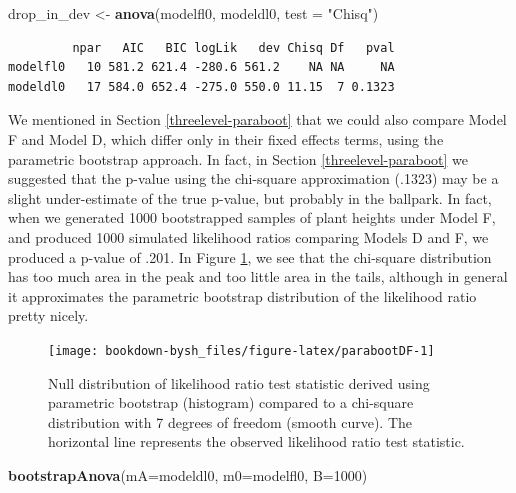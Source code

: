 \documentclass[
]{krantz}
\newenvironment{Shaded}{\begin{snugshade}}{\end{snugshade}}
\newcommand{\DataTypeTok}[1]{\textcolor[rgb]{0.27,0.27,0.27}{#1}}
\newcommand{\DecValTok}[1]{\textcolor[rgb]{0.06,0.06,0.06}{#1}}
\newcommand{\KeywordTok}[1]{\textcolor[rgb]{0.27,0.27,0.27}{\textbf{#1}}}
\newcommand{\NormalTok}[1]{#1}
\newcommand{\StringTok}[1]{\textcolor[rgb]{0.5,0.5,0.5}{#1}}
\begin{document}
\begin{Shaded}
\begin{Highlighting}[]
\NormalTok{drop_in_dev <-}\StringTok{ }\KeywordTok{anova}\NormalTok{(modelfl0, modeldl0, }\DataTypeTok{test =} \StringTok{"Chisq"}\NormalTok{)}
\end{Highlighting}
\end{Shaded}

\begin{verbatim}
         npar   AIC   BIC logLik   dev Chisq Df   pval
modelfl0   10 581.2 621.4 -280.6 561.2    NA NA     NA
modeldl0   17 584.0 652.4 -275.0 550.0 11.15  7 0.1323
\end{verbatim}

We mentioned in Section \ref{threelevel-paraboot} that we could also compare Model F and Model D, which differ only in their fixed effects terms, using the parametric bootstrap approach. In fact, in Section \ref{threelevel-paraboot} we suggested that the p-value using the chi-square approximation (.1323) may be a slight under-estimate of the true p-value, but probably in the ballpark. In fact, when we generated 1000 bootstrapped samples of plant heights under Model F, and produced 1000 simulated likelihood ratios comparing Models D and F, we produced a p-value of .201. In Figure \ref{fig:parabootDF}, we see that the chi-square distribution has too much area in the peak and too little area in the tails, although in general it approximates the parametric bootstrap distribution of the likelihood ratio pretty nicely.

\begin{figure}

{\centering \texttt{[image: bookdown-bysh\_files/figure-latex/parabootDF-1]} 

}

\caption{Null distribution of likelihood ratio test statistic derived using parametric bootstrap (histogram) compared to a chi-square distribution with 7 degrees of freedom (smooth curve).  The horizontal line represents the observed likelihood ratio test statistic.}\label{fig:parabootDF}
\end{figure}

\begin{Shaded}
\begin{Highlighting}[]
\KeywordTok{bootstrapAnova}\NormalTok{(}\DataTypeTok{mA=}\NormalTok{modeldl0, }\DataTypeTok{m0=}\NormalTok{modelfl0, }\DataTypeTok{B=}\DecValTok{1000}\NormalTok{)}
\end{Highlighting}
\end{Shaded}
\end{document}
